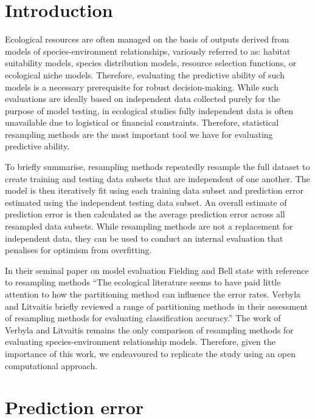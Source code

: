 \section{Introduction}

Ecological resources are often managed on the basis of outputs derived
from models of species-environment relationships, variously referred to
as: habitat suitability models, species distribution models, resource
selection functions, or ecological niche models. Therefore, evaluating
the predictive ability of such models is a necessary prerequisite for
robust decision-making. While such evaluations are ideally based on
independent data collected purely for the purpose of model testing, in
ecological studies fully independent data is often unavailable due to
logistical or financial constraints. Therefore, statistical resampling
methods are the most important tool we have for evaluating predictive
ability.

\bigskip

To briefly summarise, resampling methods repeatedly resample the full
dataset to create training and testing data subsets that are independent
of one another. The model is then iteratively fit using each training
data subset and prediction error estimated using the independent testing
data subset. An overall estimate of prediction error is then calculated
as the average prediction error across all resampled data subsets. While
resampling methods are not a replacement for independent data, they can
be used to conduct an internal evaluation that penalises for optimism
from overfitting\supercite{verbyla-1989}.

\bigskip

In their seminal paper on model evaluation Fielding and Bell\supercite{fielding-1997}
state with reference to resampling methods ``The
ecological literature seems to have paid little attention to how the
partitioning method can influence the error rates. Verbyla and Litvaitis
briefly reviewed a range of partitioning methods in their
assessment of resampling methods for evaluating classification
accuracy.'' The work of Verbyla and Litvaitis\supercite{verbyla-1989} remains the
only comparison of resampling methods for evaluating species-environment
relationship models. Therefore, given the importance of this work, we
endeavoured to replicate the study using an open computational approach.

\section{Prediction error}

